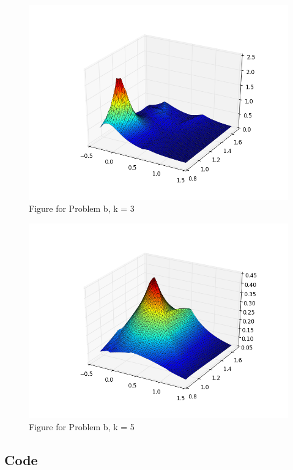 \documentclass[]{article}
\begin{document}
    \begin{figure}[H]
        \centering
        \includegraphics[scale=0.4]{6_b_3.png}
        \caption{Figure for Problem b, k = 3}
    \end{figure}
    \begin{figure}[H]
        \centering
        \includegraphics[scale=0.4]{6_b_5.png}
        \caption{Figure for Problem b, k = 5}
    \end{figure}
    \subsection{Code}
    
\end{document}
